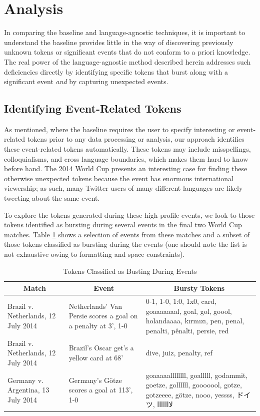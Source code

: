 \documentclass{acm_proc_article-sp}
\begin{document}
\section{Analysis}

In comparing the baseline and language-agnostic techniques, it is important to understand the baseline provides little in the way of discovering previously unknown tokens or significant events that do not conform to a priori knowledge.
The real power of the language-agnostic method described herein addresses such deficiencies directly by identifying specific tokens that burst along with a significant event \emph{and} by capturing unexpected events.

\subsection{Identifying Event-Related Tokens}

As mentioned, where the baseline requires the user to specify interesting or event-related tokens prior to any data processing or analysis, our approach identifies these event-related tokens automatically.
These tokens may include misspellings, colloquialisms, and cross language boundaries, which makes them hard to know before hand.
The 2014 World Cup presents an interesting case for finding these otherwise unexpected tokens because the event has enormous international viewership; as such, many Twitter users of many different languages are likely tweeting about the same event.

To explore the tokens generated during these high-profile events, we look to those tokens identified as bursting during several events in the final two World Cup matches.
Table \ref{tab:burstyTokens} shows a selection of events from these matches and a subset of those tokens classified as bursting during the events (one should note the list is not exhaustive owing to formatting and space constraints).

\begin{table}[htdp]
\caption{Tokens Classified as Busting During Events}
\begin{center}
\begin{tabular}{|p{0.75in}|p{0.7in}| p{1.45in} |}
\hline
\multicolumn{1}{|c|}{\textbf{Match}} & \multicolumn{1}{|c|}{\textbf{Event}} & \multicolumn{1}{|c|}{\textbf{Bursty Tokens}} \\ \hline
Brazil v. Netherlands, 12 July 2014 & Netherlands' Van Persie scores a goal on a penalty at 3', 1-0 & 0-1, 1-0, 1:0, 1x0, card, goaaaaaaal, goal, gol, goool, holandaaaa, k\i{}rm\i{}z\i{}, pen, penal, penalti, p\^{e}nalti, persie, red \\ \hline
Brazil v. Netherlands, 12 July 2014 & Brazil's Oscar get's a yellow card at 68' & dive, juiz, penalty, ref \\ \hline
Germany v. Argentina, 13 July 2014 & Germany's G\"{o}tze scores a goal at 113', 1-0 & goaaaaallllllll, goalllll, godammit, goetze, gollllll, gooooool, gotze, gotzeeee, g\"{o}tze, nooo, yessss, ドイツ, لااااااا \\ \hline
\end{tabular}
\end{center}
\label{tab:burstyTokens}
\end{table}
\end{document}
